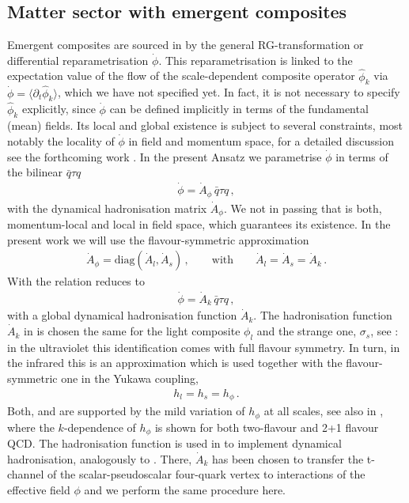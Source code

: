 \documentclass[aps,twocolumn,prd,superscriptaddress]{revtex4-2}
\begin{document}
\subsection{Matter sector with emergent composites}
\label{sec:EmergentMesons}

Emergent composites are sourced in  by the general RG-transformation or differential reparametrisation $\dot \phi$. This reparametrisation is linked to the expectation value of the flow of the scale-dependent composite operator $\hat \phi_k$ via $ \dot \phi = \langle \partial_t \hat \phi_k \rangle
$, which we have not specified yet. In fact, it is not necessary to specify $\hat \phi_k$ explicitly, since $\dot \phi$ can be defined implicitly in terms of the fundamental (mean) fields. Its local and global existence is subject to several constraints, most notably the locality of $\dot\phi$ in field and momentum space, for a detailed discussion see the forthcoming work \cite{IP2024}. In the present Ansatz we parametrise $\dot \phi$ in terms of the bilinear $\bar q \tau q$
%
\begin{align}
	\dot \phi =\dot A_\phi\, \bar q \tau q\,, 
\label{eq:Genhadronrel}
\end{align}
%
with the dynamical hadronisation matrix $\dot A_\phi$. We not in passing that  is both, momentum-local and local in field space, which guarantees its existence. In the present work we will use the flavour-symmetric approximation 
%
\begin{align}
\dot A_\phi=\textrm{diag}(\dot A_l,\dot A_s)\,,\qquad \textrm{with}\qquad \dot A_l=\dot A_s=\dot A_k\,. 
	\label{eq:dotAphi}
\end{align}
%
With  the relation  reduces to 
%
\begin{align}
	\dot \phi =\dot A_k\, \bar q \tau q\,, 
	\label{eq:hadronrel}
\end{align}
%
with a global dynamical hadronisation function $\dot A_k$. The hadronisation function $\dot A_k$ in  is chosen the same for the light composite $\phi_l$ and the strange one, $\sigma_s$, see : in the ultraviolet this identification comes with full flavour symmetry. In turn, in the infrared this is an approximation which is used together with the flavour-symmetric one in the Yukawa coupling, 
%
\begin{align}
	h_l=h_s=h_\phi\,.
	\label{eq:hpgi=hl=hs}
\end{align}
%
Both,  and 	 are supported by the mild variation of $h_\phi$ at all scales, see also  in , where the $k$-dependence of $h_{\phi}$ is shown for both two-flavour and 2+1 flavour QCD. The hadronisation function is used in  to implement dynamical hadronisation, analogously to \cite{Fu:2019hdw, Rennecke:2015}. There, $\dot A_k$ has been chosen to transfer the t-channel of the scalar-pseudoscalar four-quark vertex to interactions of the effective field $\phi$ and we perform the same procedure here. 
\end{document}
